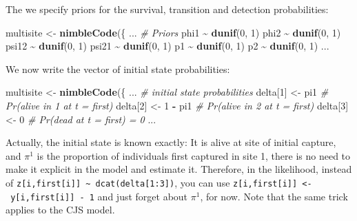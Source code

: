 \documentclass[
  12pt,
]{krantz}
\newenvironment{Shaded}{\begin{snugshade}}{\end{snugshade}}
\newcommand{\CommentTok}[1]{\textcolor[rgb]{0.56,0.35,0.01}{\textit{#1}}}
\newcommand{\DecValTok}[1]{\textcolor[rgb]{0.00,0.00,0.81}{#1}}
\newcommand{\FunctionTok}[1]{\textcolor[rgb]{0.13,0.29,0.53}{\textbf{#1}}}
\newcommand{\NormalTok}[1]{#1}
\newcommand{\OtherTok}[1]{\textcolor[rgb]{0.56,0.35,0.01}{#1}}
\newcommand{\SpecialCharTok}[1]{\textcolor[rgb]{0.81,0.36,0.00}{\textbf{#1}}}
\begin{document}
The we specify priors for the survival, transition and detection probabilities:

\begin{Shaded}
\begin{Highlighting}[]
\NormalTok{multisite }\OtherTok{\textless{}{-}} \FunctionTok{nimbleCode}\NormalTok{(\{}
\NormalTok{...}
  \CommentTok{\# Priors}
\NormalTok{  phi1 }\SpecialCharTok{\textasciitilde{}} \FunctionTok{dunif}\NormalTok{(}\DecValTok{0}\NormalTok{, }\DecValTok{1}\NormalTok{)}
\NormalTok{  phi2 }\SpecialCharTok{\textasciitilde{}} \FunctionTok{dunif}\NormalTok{(}\DecValTok{0}\NormalTok{, }\DecValTok{1}\NormalTok{)}
\NormalTok{  psi12 }\SpecialCharTok{\textasciitilde{}} \FunctionTok{dunif}\NormalTok{(}\DecValTok{0}\NormalTok{, }\DecValTok{1}\NormalTok{)}
\NormalTok{  psi21 }\SpecialCharTok{\textasciitilde{}} \FunctionTok{dunif}\NormalTok{(}\DecValTok{0}\NormalTok{, }\DecValTok{1}\NormalTok{)}
\NormalTok{  p1 }\SpecialCharTok{\textasciitilde{}} \FunctionTok{dunif}\NormalTok{(}\DecValTok{0}\NormalTok{, }\DecValTok{1}\NormalTok{)}
\NormalTok{  p2 }\SpecialCharTok{\textasciitilde{}} \FunctionTok{dunif}\NormalTok{(}\DecValTok{0}\NormalTok{, }\DecValTok{1}\NormalTok{)}
\NormalTok{...}
\end{Highlighting}
\end{Shaded}

We now write the vector of initial state probabilities:

\begin{Shaded}
\begin{Highlighting}[]
\NormalTok{multisite }\OtherTok{\textless{}{-}} \FunctionTok{nimbleCode}\NormalTok{(\{}
\NormalTok{...}
  \CommentTok{\# initial state probabilities}
\NormalTok{  delta[}\DecValTok{1}\NormalTok{] }\OtherTok{\textless{}{-}}\NormalTok{ pi1          }\CommentTok{\# Pr(alive in 1 at t = first)}
\NormalTok{  delta[}\DecValTok{2}\NormalTok{] }\OtherTok{\textless{}{-}} \DecValTok{1} \SpecialCharTok{{-}}\NormalTok{ pi1      }\CommentTok{\# Pr(alive in 2 at t = first)}
\NormalTok{  delta[}\DecValTok{3}\NormalTok{] }\OtherTok{\textless{}{-}} \DecValTok{0}            \CommentTok{\# Pr(dead at t = first) = 0}
\NormalTok{...}
\end{Highlighting}
\end{Shaded}

Actually, the initial state is known exactly: It is alive at site of initial capture, and \(\pi^1\) is the proportion of individuals first captured in site 1, there is no need to make it explicit in the model and estimate it. Therefore, in the likelihood, instead of \texttt{z{[}i,first{[}i{]}{]}\ \textasciitilde{}\ dcat(delta{[}1:3{]})}, you can use \texttt{z{[}i,first{[}i{]}{]}\ \textless{}-\ y{[}i,first{[}i{]}{]}\ -\ 1} and just forget about \(\pi^1\), for now. Note that the same trick applies to the CJS model.
\end{document}
